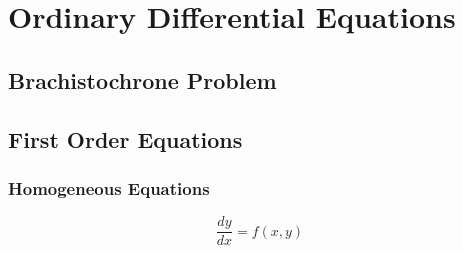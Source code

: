 \part{Ordinary Differential Equations}

\chapter{Brachistochrone Problem}

\chapter{First Order Equations}

\section{Homogeneous Equations}

\begin{equation*}
    \frac{dy}{dx} = f(x, y)
\end{equation*}